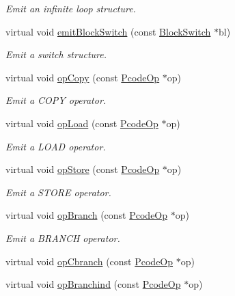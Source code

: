 \begin{DoxyCompactItemize}
\begin{DoxyCompactList}\small\item\em Emit an infinite loop structure. \end{DoxyCompactList}\item 
virtual void \mbox{\hyperlink{class_print_c_a5325157c245650f118d7b57c08000f2a}{emit\+Block\+Switch}} (const \mbox{\hyperlink{class_block_switch}{Block\+Switch}} $\ast$bl)
\begin{DoxyCompactList}\small\item\em Emit a switch structure. \end{DoxyCompactList}\item 
virtual void \mbox{\hyperlink{class_print_c_a60fa8313562ee222929335f6dd5d0183}{op\+Copy}} (const \mbox{\hyperlink{class_pcode_op}{Pcode\+Op}} $\ast$op)
\begin{DoxyCompactList}\small\item\em Emit a C\+O\+PY operator. \end{DoxyCompactList}\item 
virtual void \mbox{\hyperlink{class_print_c_a263dc1f6686e7792bcdd29006aaaac4a}{op\+Load}} (const \mbox{\hyperlink{class_pcode_op}{Pcode\+Op}} $\ast$op)
\begin{DoxyCompactList}\small\item\em Emit a L\+O\+AD operator. \end{DoxyCompactList}\item 
virtual void \mbox{\hyperlink{class_print_c_ab75e8802e935da6fc54a023e03c4e5e7}{op\+Store}} (const \mbox{\hyperlink{class_pcode_op}{Pcode\+Op}} $\ast$op)
\begin{DoxyCompactList}\small\item\em Emit a S\+T\+O\+RE operator. \end{DoxyCompactList}\item 
virtual void \mbox{\hyperlink{class_print_c_a621532e1c7ee910a405e4229af440fe8}{op\+Branch}} (const \mbox{\hyperlink{class_pcode_op}{Pcode\+Op}} $\ast$op)
\begin{DoxyCompactList}\small\item\em Emit a B\+R\+A\+N\+CH operator. \end{DoxyCompactList}\item 
virtual void \mbox{\hyperlink{class_print_c_a2987b80bf701c0c300d672d920a36162}{op\+Cbranch}} (const \mbox{\hyperlink{class_pcode_op}{Pcode\+Op}} $\ast$op)
\item 
virtual void \mbox{\hyperlink{class_print_c_a12483a33c61014df2e565295a7705470}{op\+Branchind}} (const \mbox{\hyperlink{class_pcode_op}{Pcode\+Op}} $\ast$op)

\end{DoxyCompactItemize}
